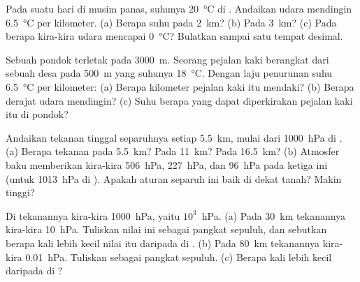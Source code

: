 \begin{exercise}[$\star\star$]\label{exo:g8:the-atmosphere:5}
Pada suatu hari di musim panas, suhunya \qty{20}{\degreeCelsius} di
. Andaikan udara mendingin \qty{6.5}{\degreeCelsius} per
kilometer. (a) Berapa suhu pada \qty{2}{km}? (b) Pada \qty{3}{km}? (c) Pada
 berapa kira-kira udara mencapai \qty{0}{\degreeCelsius}?
Bulatkan sampai satu tempat desimal.
\end{exercise}

\begin{exercise}[$\star\star$]\label{exo:g8:the-atmosphere:6}
Sebuah pondok  terletak pada  \qty{3000}{m}. Seorang
pejalan kaki berangkat dari sebuah desa pada  \qty{500}{m} yang
suhunya \qty{18}{\degreeCelsius}. Dengan laju penurunan suhu
\qty{6.5}{\degreeCelsius} per kilometer: (a) Berapa kilometer pejalan kaki
itu mendaki? (b) Berapa derajat udara mendingin? (c) Suhu berapa yang
dapat diperkirakan pejalan kaki itu di pondok?
\end{exercise}

\begin{exercise}[$\star\star$]\label{exo:g8:the-atmosphere:7}
Andaikan tekanan tinggal separuhnya setiap \qty{5.5}{km}, mulai dari
\qty{1000}{hPa} di . (a) Berapa tekanan pada \qty{5.5}{km}?
Pada \qty{11}{km}? Pada \qty{16.5}{km}? (b) Atmosfer baku memberikan
kira-kira \qty{506}{hPa}, \qty{227}{hPa}, dan \qty{96}{hPa} pada ketiga
 ini (untuk \qty{1013}{hPa} di ). Apakah aturan
separuh ini baik di dekat tanah? Makin tinggi?
\end{exercise}

\begin{exercise}[$\star\star$]\label{exo:g8:the-atmosphere:8}
Di  tekanannya kira-kira \qty{1000}{hPa}, yaitu $10^3$~hPa.
(a) Pada \qty{30}{km} tekanannya kira-kira \qty{10}{hPa}. Tuliskan nilai
ini sebagai pangkat sepuluh, dan sebutkan berapa kali lebih kecil nilai itu
daripada di . (b) Pada \qty{80}{km} tekanannya kira-kira
\qty{0.01}{hPa}. Tuliskan sebagai pangkat sepuluh. (c) Berapa kali lebih
kecil daripada di ?
\end{exercise}

